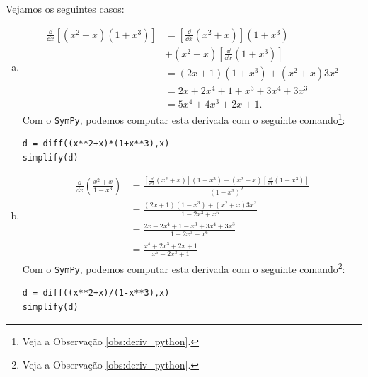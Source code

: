 \begin{ex}
  Vejamos os seguintes casos:
  \begin{enumerate}[a)]
  \item
    \begin{align}
      \frac{\dd}{\dd x}\left[(x^2+x)(1 + x^3)\right] &= \left[\frac{\dd}{\dd x} (x^2+x)\right](1+x^3) \\
                                                     &+ (x^2+x)\left[\frac{\dd}{\dd x}(1+x^3)\right]\\
                                                     &= (2x+1)(1+x^3)+(x^2+x)3x^2\\
                                                     &= 2x+2x^4+1+x^3+3x^4+3x^3\\
                                                     &= 5x^4+4x^3+2x+1.
    \end{align}
    \ifispython
    Com o \verb+SymPy+, podemos computar esta derivada com o seguinte comando\footnote{Veja a Observação \ref{obs:deriv_python}.}:
\begin{verbatim}
d = diff((x**2+x)*(1+x**3),x)
simplify(d)
\end{verbatim}
    \fi

\item
  \begin{align}
    \frac{\dd}{\dd x}\left(\frac{x^2+x}{1-x^3}\right) &= \frac{\left[\frac{\dd}{\dd x}(x^2+x)\right](1-x^3)-(x^2+x)\left[\frac{\dd}{\dd x}(1-x^3)\right]}{(1-x^3)^2}\\
                                                      &= \frac{(2x+1)(1-x^3)+(x^2+x)3x^2}{1-2x^3+x^6} \\
                                                      &= \frac{2x-2x^4+1-x^3+3x^4+3x^3}{1-2x^3+x^6} \\
                                                      &= \frac{x^4+2x^3+2x+1}{x^6-2x^3+1}
  \end{align}
  \ifispython
  Com o \verb+SymPy+, podemos computar esta derivada com o seguinte comando\footnote{Veja a Observação \ref{obs:deriv_python}.}:
\begin{verbatim}
d = diff((x**2+x)/(1-x**3),x)
simplify(d)
\end{verbatim}
  \fi
  \end{enumerate}
\end{ex}

